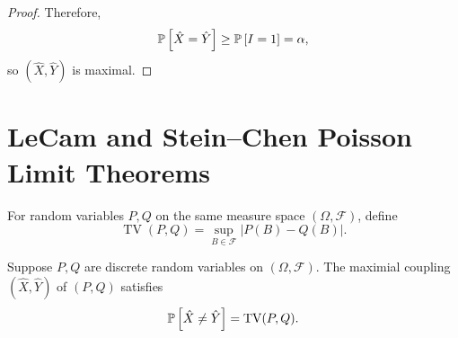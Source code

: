 \begin{proof}
	Therefore, \[
		\P\left[\hat{X} = \hat{Y}\right] \ge \P\left[I = 1\right]  = \alpha
	,\] so $(\hat{X},\hat{Y})$ is maximal.
\end{proof}

\section{LeCam and Stein--Chen Poisson Limit Theorems}

\begin{definition}
	For random variables $P,Q$ on the same measure space $\left( \Omega, \mathscr{F} \right)$, define \[
		\operatorname{TV}(P,Q) = \sup_{B \in \mathscr{F}} \left| P(B) - Q(B) \right|
	.\] 
\end{definition}
\begin{theorem} \label{3-1-1}
	Suppose $P,Q$ are discrete random variables on $\left( \Omega, \mathscr{F} \right)$. The maximial coupling $(\hat{X},\hat{Y})$ of $(P,Q)$ satisfies \[
		\P\left[\hat{X} \ne \hat{Y}\right] = \operatorname{TV}(P,Q)
	.\] 
\end{theorem}


